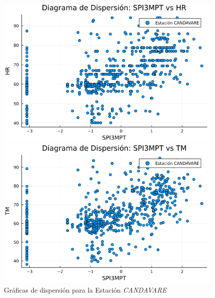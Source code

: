 \begin{figure}[htbp]
\centering
\caption{Gráficas de dispersión para la Estación \textit{CANDAVARE}}
\begin{minipage}{0.32\textwidth}
    \centering
    \includegraphics[width=\linewidth]{Capitulos/Scaterplot/CANDAVARE_SPI3MPT_vs_HR.png}
\end{minipage}\hfill
\begin{minipage}{0.32\textwidth}
    \centering
    \includegraphics[width=\linewidth]{Capitulos/Scaterplot/CANDAVARE_SPI3MPT_vs_TM.png}
\end{minipage}\hfill
\begin{minipage}{0.32\textwidth}
    \centering

\end{minipage}
\end{figure}
